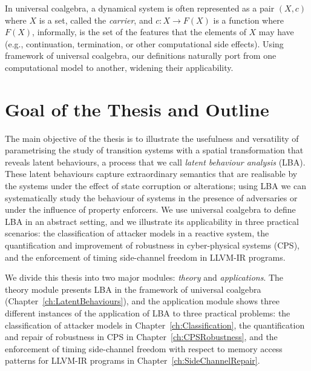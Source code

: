 In universal coalgebra, a dynamical system is often represented as a pair $(X,c)$ where $X$ is a set, called the \emph{carrier}, and $c\colon X\rightarrow F(X)$ is a function where $F(X)$, informally, is the set of the features that the elements of $X$ may have (e.g., continuation, termination, or other computational side effects). Using framework of universal coalgebra, our definitions naturally port from one computational model to another, widening their applicability. 




\section{Goal of the Thesis and Outline}
\label{sec:Introduction:Goal}
The main objective of the thesis is to illustrate the usefulness and versatility of parametrising the study of transition systems with a spatial transformation that reveals latent behaviours, a process that we call \emph{latent behaviour analysis} (LBA). These latent behaviours capture extraordinary semantics that are realisable by the systems under the effect of state corruption or alterations; using LBA we can systematically study the behaviour of systems in the presence of adversaries or under the influence of property enforcers. We use universal coalgebra to define LBA in an abstract setting, and we illustrate its applicability in three practical scenarios: the classification of attacker models in a reactive system, the quantification and improvement of robustness in cyber-physical systems (CPS), and the enforcement of timing side-channel freedom in LLVM-IR programs. 

We divide this thesis into two major modules: \emph{theory} and \emph{applications}. The theory module presents LBA in the framework of universal coalgebra (Chapter~\ref{ch:LatentBehaviours}), and the application module shows three different instances of the application of LBA to three practical problems: the classification of attacker models in Chapter~\ref{ch:Classification}, the quantification and repair of robustness in CPS in Chapter~\ref{ch:CPSRobustness}, and the enforcement of timing side-channel freedom with respect to memory access patterns for LLVM-IR programs in Chapter~\ref{ch:SideChannelRepair}.

